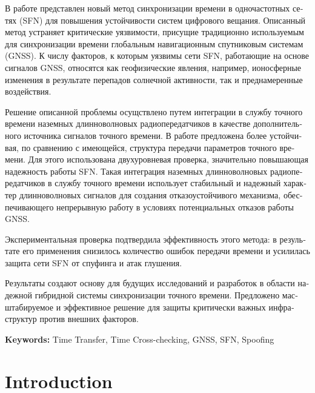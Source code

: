 \documentclass[12pt, a4paper]{extarticle}
\begin{document}
\begin{otherlanguage}{russian}
    В работе представлен новый метод синхронизации времени в одночастотных
    сетях (SFN) для повышения устойчивости систем цифрового вещания. Описанный
    метод устраняет критические уязвимости, присущие традиционно используемым
    для синхронизации времени глобальным навигационным спутниковым системам
    (GNSS). К числу факторов, к которым уязвимы сети SFN, работающие на основе
    сигналов GNSS, относятся как геофизические явления, например, ионосферные
    изменения в результате перепадов солнечной активности, так и преднамеренные
    воздействия.

    Решение описанной проблемы осущствлено путем интеграции в службу точного
    времени наземных длинноволновых радиопередатчиков в качестве
    дополнительного источника сигналов точного времени. В работе предложена
    более устойчивая, по сравнению с имеющейся, структура передачи параметров
    точного времени. Для этого использована двухуровневая проверка, значительно
    повышающая надежность работы SFN. Такая интеграция наземных длинноволновых
    радиопередатчиков в службу точного времени использует стабильный и надежный
    характер длинноволновых сигналов для создания отказоустойчивого механизма,
    обеспечивающего непрерывную работу в условиях потенциальных отказов работы
    GNSS.

    Экспериментальная проверка подтвердила эффективность этого метода: в
    результате его применения снизилось количество ошибок передачи времени и
    усилилась защита сети SFN от спуфинга и атак глушения.

    Результаты создают основу для будущих исследований и разработок в области
    надежной гибридной системы синхронизации точного времени. Предложено
    масштабируемое и эффективное решение для защиты критически важных
    инфраструктур против внешних факторов.
\end{otherlanguage}

\vfill

\textbf{Keywords:}
Time Transfer, Time Cross-checking, GNSS, SFN, Spoofing

\pagebreak

\section{Introduction}
\end{document}
